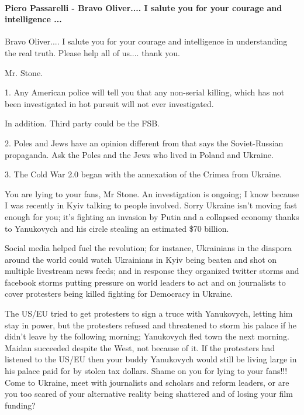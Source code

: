  
 
 
 
 
\paragraph{Piero Passarelli - Bravo Oliver.... I salute you for your courage and intelligence ...}

\begin{itemize} %

Bravo Oliver.... I salute you for your courage and intelligence in understanding
the real truth. Please help all of us.... thank you.

Mr. Stone.

1. Any American police will tell you that any non-serial killing, which has not
been investigated in hot pursuit will not ever investigated.

In addition. Third party could be the FSB.

2. Poles and Jews have an opinion different from that says the Soviet-Russian
propaganda. Ask the Poles and the Jews who lived in Poland and Ukraine.

3. The Cold War 2.0 began with the annexation of the Crimea from Ukraine.


You are lying to your fans, Mr Stone. An investigation is ongoing; I know
because I was recently in Kyiv talking to people involved. Sorry Ukraine isn't
moving fast enough for you; it's fighting an invasion by Putin and a collapsed
economy thanks to Yanukovych and his circle stealing an estimated \$70 billion.

Social media helped fuel the revolution; for instance, Ukrainians in the
diaspora around the world could watch Ukrainians in Kyiv being beaten and shot
on multiple livestream news feeds; and in response they organized twitter
storms and facebook storms putting pressure on world leaders to act and on
journalists to cover protesters being killed fighting for Democracy in Ukraine.

The US/EU tried to get protesters to sign a truce with Yanukovych, letting him
stay in power, but the protesters refused and threatened to storm his palace if
he didn't leave by the following morning; Yanukovych fled town the next
morning. Maidan succeeded despite the West, not because of it. If the
protesters had listened to the US/EU then your buddy Yanukovych would still be
living large in his palace paid for by stolen tax dollars. Shame on you for
lying to your fans!!! Come to Ukraine, meet with journalists and scholars and
reform leaders, or are you too scared of your alternative reality being
shattered and of losing your film funding?


\end{itemize}
